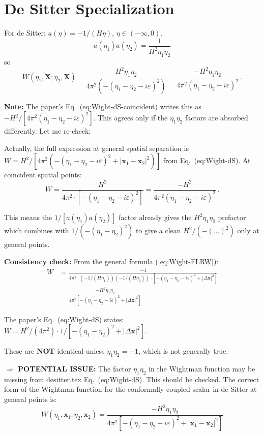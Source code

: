 \documentclass[12pt]{article}
\newcommand{\Scfac}{a}
\newcommand{\Wight}{W}
\newcommand{\be}{\begin{equation}}
\newcommand{\ee}{\end{equation}}
\begin{document}
\section{De Sitter Specialization}

For de Sitter: $\Scfac(\eta) = -1/(H\eta)$, $\eta \in (-\infty, 0)$.
\be
  \Scfac(\eta_1)\Scfac(\eta_2) = \frac{1}{H^2 \eta_1 \eta_2}
\ee
so
\be
  \Wight(\eta_1, \mathbf{X}; \eta_2, \mathbf{X})
  = \frac{H^2 \eta_1 \eta_2}{4\pi^2 (-({\eta_1 - \eta_2 - i\varepsilon})^2)}
  = \frac{-H^2 \eta_1 \eta_2}{4\pi^2 (\eta_1-\eta_2-i\varepsilon)^2} \,.
\ee

\textbf{Note:} The paper's Eq.~(eq:Wight-dS-coincident) writes this as
$-H^2/[4\pi^2(\eta_1-\eta_2-i\varepsilon)^2]$. This agrees only if the
$\eta_1\eta_2$ factors are absorbed differently. Let me re-check:

Actually, the full expression at general spatial separation is
$\Wight = H^2/[4\pi^2(-({\eta_1-\eta_2-i\varepsilon})^2 + |\mathbf{x}_1-\mathbf{x}_2|^2)]$
from Eq.~(eq:Wight-dS).  At coincident spatial points:
\be
  \Wight = \frac{H^2}{4\pi^2 \cdot [-({\eta_1-\eta_2-i\varepsilon})^2]}
  = \frac{-H^2}{4\pi^2 (\eta_1-\eta_2-i\varepsilon)^2} \,.
\ee

This means the $1/[\Scfac(\eta_1)\Scfac(\eta_2)]$ factor already gives the $H^2\eta_1\eta_2$ prefactor which combines with $1/(-(\eta_1-\eta_2)^2)$ to give a clean $H^2/(-(...)^2)$ only at general points.

\textbf{Consistency check:} From the general formula (\ref{eq:Wight-FLRW}):
\begin{align}
  \Wight &= \frac{-1}{4\pi^2 \cdot (-1/(H\eta_1))(-1/(H\eta_2)) \cdot [-({\eta_1-\eta_2-i\varepsilon})^2 + |\Delta\mathbf{x}|^2]} \\
  &= \frac{-H^2 \eta_1 \eta_2}{4\pi^2 [-({\eta_1-\eta_2-i\varepsilon})^2 + |\Delta\mathbf{x}|^2]}
\end{align}

The paper's Eq.~(eq:Wight-dS) states:
$\Wight = H^2/(4\pi^2) \cdot 1/[-({\eta_1-\eta_2})^2 + |\Delta\mathbf{x}|^2]$.

These are \textbf{NOT} identical unless $\eta_1\eta_2 = -1$, which is not generally true.

\medskip
\textbf{$\Rightarrow$ POTENTIAL ISSUE:} The factor $\eta_1\eta_2$ in the Wightman function
may be missing from desitter.tex Eq.~(eq:Wight-dS). This should be checked.
The correct form of the Wightman function for the conformally coupled scalar
in de Sitter at general points is:
\be
  \Wight(\eta_1, \mathbf{x}_1; \eta_2, \mathbf{x}_2)
  = \frac{-H^2\eta_1\eta_2}{4\pi^2[-(\eta_1-\eta_2-i\varepsilon)^2 + |\mathbf{x}_1-\mathbf{x}_2|^2]}
\ee
\end{document}
